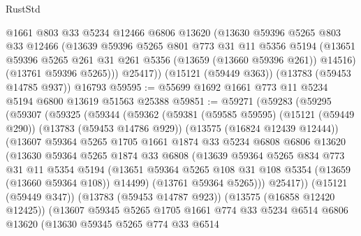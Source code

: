 \begin{lexlean}{RustStd}
\begin{coremodule}
        @1661
        @803
        @33
        @5234
        @12466
        @6806
        @13620
        (@13630
          @59396
          @5265
          @803
          @33
          @12466
          (@13639
            @59396
            @5265
            @801
            @773
            @31
            @11
            @5356
            @5194
            (@13651 @59396 @5265 @261 @31 @261 @5356 (@13659 (@13660 @59396 @261)) @14516)
            (@13761 @59396 @5265)))
        @25417))
    (@15121 (@59449 @363))
    (@13783 (@59453 @14785 @937))
    @16793
@59595 := @55699 @1692 @1661 @773 @11 @5234 @5194 @6800 @13619 @51563 @25388
@59851 := @59271
    (@59283
      (@59295
        (@59307
          (@59325
            (@59344
              (@59362
                (@59381
                  (@59585 @59595)
                  (@15121 (@59449 @290))
                  (@13783 (@59453 @14786 @929))
                  (@13575 (@16824 @12439 @12444))
                  (@13607
                    @59364
                    @5265
                    @1705
                    @1661
                    @1874
                    @33
                    @5234
                    @6808
                    @6806
                    @13620
                    (@13630
                      @59364
                      @5265
                      @1874
                      @33
                      @6808
                      (@13639
                        @59364
                        @5265
                        @834
                        @773
                        @31
                        @11
                        @5354
                        @5194
                        (@13651
                          @59364
                          @5265
                          @108
                          @31
                          @108
                          @5354
                          (@13659 (@13660 @59364 @108))
                          @14499)
                        (@13761 @59364 @5265)))
                    @25417))
                (@15121 (@59449 @347))
                (@13783 (@59453 @14787 @923))
                (@13575 (@16858 @12420 @12425))
                (@13607
                  @59345
                  @5265
                  @1705
                  @1661
                  @774
                  @33
                  @5234
                  @6514
                  @6806
                  @13620
                  (@13630
                    @59345
                    @5265
                    @774
                    @33
                    @6514

\end{coremodule}
\end{lexlean}
